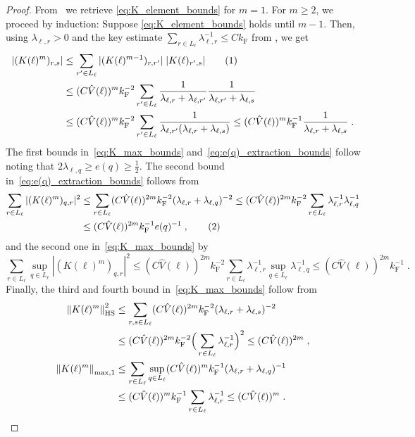 \documentclass[12pt,a4paper]{article}
\numberwithin{equation}{section}
\newcommand{\1}{\mathbb{I}}
\newcommand{\F}{\mathrm{F}}
\newcommand{\HS}{\mathrm{HS}}
\newcommand{\tagg}[1]{ \stepcounter{equation} \tag{\theequation}
\label{#1} } %
\newcommand{\half}{\frac{1}{2}}
\newcommand{\normmaxi}[1]{\norm{#1}_{\mathrm{max,1}}}
\theoremstyle{plain}
\theoremstyle{definition}
\theoremstyle{remark}
\theoremstyle{plain}
\theoremstyle{definition}
\theoremstyle{remark}
\begin{document}
\begin{proof}
From~\cite[Prop.~7.10]{CHN23} we retrieve \eqref{eq:K_element_bounds} for $ m = 1 $. For $ m \ge 2 $, we proceed by induction: Suppose \eqref{eq:K_element_bounds} holds until $ m-1 $. Then, using $ \lambda_{\ell,r} > 0 $ and the key estimate $ \sum_{r \in L_\ell} \lambda_{\ell,r}^{-1} \le C k_{\F} $ from \cite[Prop.~A.2]{CHN21}, we get
\begin{align*}
		|(K(\ell)^m)_{r,s}|
		&\le \sum_{r' \in L_\ell}
		|(K(\ell)^{m-1})_{r,r'}| \;
		|K(\ell)_{r',s}| \tagg{eq:notimportant1} \\
			& \le (C \hat{V}(\ell))^m k_{\F}^{-2} \sum_{r' \in L_\ell}
		\frac{1}{\lambda_{\ell, r} + \lambda_{\ell, r'}}
		\frac{1}{\lambda_{\ell, r'} + \lambda_{\ell, s}} \\
		&\le (C \hat{V}(\ell))^m k_{\F}^{-2} \sum_{r' \in L_\ell}
		\frac{1}{\lambda_{\ell, r'} (\lambda_{\ell, r} + \lambda_{\ell, s})}
		\le (C \hat{V}(\ell))^m k_{\F}^{-1}
		\frac{1}{\lambda_{\ell, r} + \lambda_{\ell, s}} \;.
\end{align*}
The first bounds in~\eqref{eq:K_max_bounds} and~\eqref{eq:e(q)_extraction_bounds} follow  noting that $ 2 \lambda_{\ell,q} \ge e(q) \ge \half $. The second bound in~\eqref{eq:e(q)_extraction_bounds} follows from
\begin{align*}
	\sum_{r \in L_\ell} |(K(\ell)^m)_{q,r}|^2
	&\le \sum_{r \in L_\ell} (C \hat{V}(\ell))^{2m} k_{\F}^{-2} (\lambda_{\ell,r} + \lambda_{\ell,q})^{-2}
	\le (C \hat{V}(\ell))^{2m} k_{\F}^{-2} \sum_{r \in L_\ell} \lambda_{\ell,r}^{-1} \lambda_{\ell,q}^{-1} \\
	&\le (C \hat{V}(\ell))^{2m} k_{\F}^{-1} e(q)^{-1} \;, \tagg{eq:notimportant}
\end{align*}
and the second one in~\eqref{eq:K_max_bounds} by
\begin{equation}
	\sum_{r \in L_\ell} \sup_{q \in L_\ell} |(K(\ell)^m)_{q,r}|^2
	\le (C \hat{V}(\ell))^{2m} k_{\F}^{-2} \sum_{r \in L_\ell} \lambda_{\ell,r}^{-1} 
		\sup_{q \in L_\ell} \lambda_{\ell,q}^{-1}
	\le (C \hat{V}(\ell))^{2m} k_{\F}^{-1} \;.
\end{equation}
Finally, the third and fourth bound in~\eqref{eq:K_max_bounds} follow from
\begin{align}
	\norm{K(\ell)^m}_{\HS}^2
	&\le \sum_{r,s \in L_\ell} (C \hat{V}(\ell))^{2m} k_{\F}^{-2} (\lambda_{\ell,r} + \lambda_{\ell,s})^{-2} \\
	&	\le (C \hat{V}(\ell))^{2m} k_{\F}^{-2} \Big( \sum_{r \in L_\ell} \lambda_{\ell,r}^{-1} \Big)^2
	\le (C \hat{V}(\ell))^{2m} \;, \\
	\normmaxi{K(\ell)^m} 
	&\leq \sum_{r \in L_\ell} \sup_{q \in L_\ell} (C \hat{V}(\ell))^{m} k_{\F}^{-1} (\lambda_{\ell,r} + \lambda_{\ell,q})^{-1} \\ & \le (C \hat{V}(\ell))^{m} k_{\F}^{-1} \sum_{r \in L_\ell} \lambda_{\ell,r}^{-1} \leq (C \hat{V}(\ell))^{m} \;.	\qedhere
\end{align}
\end{proof}
\end{document}
